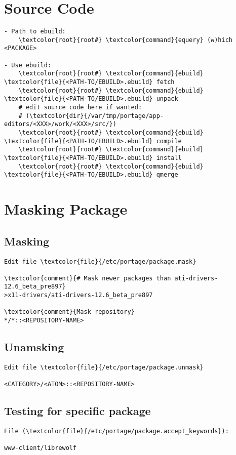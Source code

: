 \documentclass[10pt, a4paper, onecolumn, openany]{book}         %
\begin{document}
\section{Source Code}
\begin{Verbatim}[commandchars=\\\{\}]
- Path to ebuild:
    \textcolor{root}{root#} \textcolor{command}{equery} (w)hich <PACKAGE>
    
- Use ebuild:
    \textcolor{root}{root#} \textcolor{command}{ebuild} \textcolor{file}{<PATH-TO/EBUILD>.ebuild} fetch
    \textcolor{root}{root#} \textcolor{command}{ebuild} \textcolor{file}{<PATH-TO/EBUILD>.ebuild} unpack
    # edit source code here if wanted:
    # (\textcolor{dir}{/var/tmp/portage/app-editors/<XXX>/work/<XXX>/src/})
    \textcolor{root}{root#} \textcolor{command}{ebuild} \textcolor{file}{<PATH-TO/EBUILD>.ebuild} compile
    \textcolor{root}{root#} \textcolor{command}{ebuild} \textcolor{file}{<PATH-TO/EBUILD>.ebuild} install
    \textcolor{root}{root#} \textcolor{command}{ebuild} \textcolor{file}{<PATH-TO/EBUILD>.ebuild} qmerge
\end{Verbatim}

\section{Masking Package}
\subsection{Masking}
\begin{Verbatim}[commandchars=\\\{\}]
Edit file \textcolor{file}{/etc/portage/package.mask}

\textcolor{comment}{# Mask newer packages than ati-drivers-12.6_beta_pre897}
>x11-drivers/ati-drivers-12.6_beta_pre897

\textcolor{comment}{Mask repository}
*/*::<REPOSITORY-NAME>
\end{Verbatim}
\subsection{Unamsking}
\begin{Verbatim}[commandchars=\\\{\}]
Edit file \textcolor{file}{/etc/portage/package.unmask}

<CATEGORY>/<ATOM>::<REPOSITORY-NAME>
\end{Verbatim}

\subsection{Testing for specific package}
\begin{Verbatim}[commandchars=\\\{\}]
File (\textcolor{file}{/etc/portage/package.accept_keywords}):

www-client/librewolf
\end{Verbatim}
\end{document}
